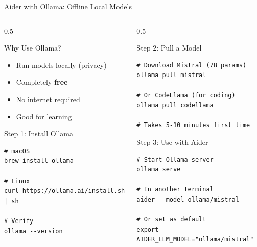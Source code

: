 \documentclass[aspectratio=169,11pt]{beamer}
\begin{document}
\begin{frame}[fragile]{Aider with Ollama: Offline Local Models}
    \begin{columns}[T]
        \begin{column}{0.5\textwidth}
            \begin{block}{Why Use Ollama?}
                \begin{itemize}
                    \item Run models locally (privacy)
                    \item Completely \textbf{free}
                    \item No internet required
                    \item Good for learning
                \end{itemize}
            \end{block}

            \begin{block}{Step 1: Install Ollama}
                \begin{lstlisting}[style=bash]
# macOS
brew install ollama

# Linux
curl https://ollama.ai/install.sh | sh

# Verify
ollama --version
                \end{lstlisting}
            \end{block}
        \end{column}
        \begin{column}{0.5\textwidth}
            \begin{block}{Step 2: Pull a Model}
                \begin{lstlisting}[style=bash]
# Download Mistral (7B params)
ollama pull mistral

# Or CodeLlama (for coding)
ollama pull codellama

# Takes 5-10 minutes first time
                \end{lstlisting}
            \end{block}

            \begin{block}{Step 3: Use with Aider}
                \begin{lstlisting}[style=bash]
# Start Ollama server
ollama serve

# In another terminal
aider --model ollama/mistral

# Or set as default
export AIDER_LLM_MODEL="ollama/mistral"
                \end{lstlisting}
            \end{block}
        \end{column}
    \end{columns}

\end{frame}
\end{document}

